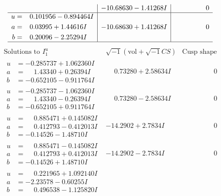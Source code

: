 \documentclass[1p]{elsarticle_modified}
\theoremstyle{definition}
\newcommand{\I}{\sqrt{-1}}
\begin{document}
$$\begin{array}{c|c|c}
 & -10.68630 - 1.41268 I & \phantom{-0.000000 } 0 \\ \hline\begin{aligned}
u &= \phantom{-}0.101956 - 0.894464 I \\
a &= \phantom{-}0.03995 + 1.44616 I \\
b &= \phantom{-}0.20096 - 2.25294 I\end{aligned}
 & -10.68630 + 1.41268 I & \phantom{-0.000000 } 0\\
 \hline 
 \end{array}$$\newpage$$\begin{array}{c|c|c}  
\text{Solutions to }I^u_{1}& \I (\text{vol} + \sqrt{-1}CS) & \text{Cusp shape}\\
 \hline 
\begin{aligned}
u &= -0.285737 + 1.062360 I \\
a &= \phantom{-}1.43340 + 0.26394 I \\
b &= -0.652105 - 0.911764 I\end{aligned}
 & \phantom{-}0.73280 + 2.58634 I & \phantom{-0.000000 } 0 \\ \hline\begin{aligned}
u &= -0.285737 - 1.062360 I \\
a &= \phantom{-}1.43340 - 0.26394 I \\
b &= -0.652105 + 0.911764 I\end{aligned}
 & \phantom{-}0.73280 - 2.58634 I & \phantom{-0.000000 } 0 \\ \hline\begin{aligned}
u &= \phantom{-}0.885471 + 0.145082 I \\
a &= \phantom{-}0.412793 - 0.412013 I \\
b &= -0.14526 - 1.48710 I\end{aligned}
 & -14.2902 + 2.7834 I & \phantom{-0.000000 } 0 \\ \hline\begin{aligned}
u &= \phantom{-}0.885471 - 0.145082 I \\
a &= \phantom{-}0.412793 + 0.412013 I \\
b &= -0.14526 + 1.48710 I\end{aligned}
 & -14.2902 - 2.7834 I & \phantom{-0.000000 } 0 \\ \hline\begin{aligned}
u &= \phantom{-}0.221965 + 1.092140 I \\
a &= -2.23578 - 0.60255 I \\
b &= \phantom{-}0.496538 - 1.125820 I\end{aligned}

\end{array}$$
\end{document}
